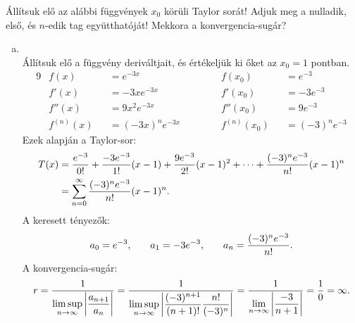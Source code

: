 \documentclass[exercise]{math-standalone}
\begin{document}
\begin{exercise}{%
    Állítsuk elő az alábbi függvények $x_0$ körüli Taylor sorát!
    Adjuk meg a nulladik, első, és $n$-edik tag együtthatóját! Mekkora a
    konvergencia-sugár?
  }
{\begin{enumerate}[a)]
      \item {}\\[3mm]
            Állítsuk elő a függvény deriváltjait, és értékeljük ki őket az
            $x_0 = 1$ pontban.
            \begin{alignat*}{9}
               & f(x)       &  & = e^{-3x}                 &  & f(x_0)       &  & = e^{-3}        \\
               & f'(x)      &  & = -3xe^{-3x} \hspace{2cm} &  & f'(x_0)      &  & = -3 e^{-3}     \\
               & f''(x)     &  & = 9x^2e^{-3x}             &  & f''(x_0)     &  & = 9 e^{-3}      \\
               & f^{(n)}(x) &  & = (-3x)^n e^{-3x}         &  & f^{(n)}(x_0) &  & = (-3)^n e^{-3}
            \end{alignat*}
            Ezek alapján a Taylor-sor:
            \begin{align*}
              T(x)
               & = \frac{e^{-3}}{0!}
              + \frac{-3e^{-3}}{1!}(x - 1)
              + \frac{9e^{-3}}{2!}(x - 1)^2
              + \dots
              + \frac{(-3)^n e^{-3}}{n!} (x - 1)^n
              \\
               & = \sum_{n = 0}^\infty
              \frac{(-3)^n e^{-3}}{n!}(x - 1)^n
              \text.
            \end{align*}
            A keresett tényezők:
            \[
              a_0 = e^{-3}
              \text, \qquad
              a_1 = -3 e^{-3}
              \text, \qquad
              a_n = \frac{(-3)^n e^{-3}}{n!}
              \text.
            \]
            A konvergencia-sugár:
            \[
              r
              = \frac{1}{\displaystyle\limsup_{n \rightarrow \infty} \left|
                \dfrac{a_{n+1}}{a_n}
                \right|
              }
              = \frac{1}{\displaystyle\limsup_{n \rightarrow \infty} \left|
                \dfrac{(-3)^{n+1} \vphantom{e^{-3}}}{(n+1)!}
                \dfrac{n!}{(-3)^n \vphantom{e^{-3}}}
                \right|}
              = \frac{1}{\displaystyle\lim_{n \rightarrow \infty} \left|
                \dfrac{-3}{n+1}
                \right|}
              = \frac{1}{0}
              = \infty
              \text.
            \]
    \end{enumerate}
  }
\end{exercise}
\end{document}
